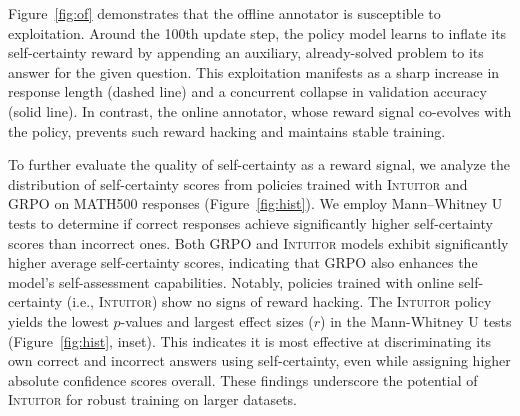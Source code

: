 \documentclass{article} %
\newcommand{\methodname}{\textsc{Intuitor}\xspace}
\begin{document}
Figure~\ref{fig:of} demonstrates that the offline annotator is susceptible to exploitation. Around the 100th update step, the policy model learns to inflate its self-certainty reward by appending an auxiliary, already-solved problem to its answer for the given question. This exploitation manifests as a sharp increase in response length (dashed line) and a concurrent collapse in validation accuracy (solid line). In contrast, the online annotator, whose reward signal co-evolves with the policy, prevents such reward hacking and maintains stable training.

To further evaluate the quality of self-certainty as a reward signal, we analyze the distribution of self-certainty scores from policies trained with \methodname and GRPO on MATH500 responses (Figure~\ref{fig:hist}). We employ Mann–Whitney U tests to determine if correct responses achieve significantly higher self-certainty scores than incorrect ones. Both GRPO and \methodname models exhibit significantly higher average self-certainty scores, indicating that GRPO also enhances the model's self-assessment capabilities. Notably, policies trained with online self-certainty (i.e., \methodname) show no signs of reward hacking. The \methodname policy yields the lowest $p$-values and largest effect sizes ($r$) in the Mann-Whitney U tests (Figure~\ref{fig:hist}, inset). This indicates it is most effective at discriminating its own correct and incorrect answers using self-certainty, even while assigning higher absolute confidence scores overall. These findings underscore the potential of \methodname for robust training on larger datasets.
\end{document}
